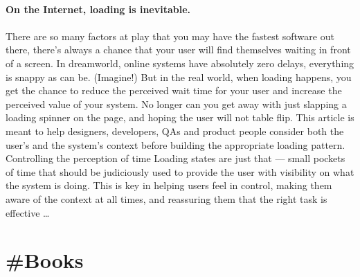 \documentclass[10pt,a4paper]{article}
\begin{document}
\begin{multicols}{2}
\paragraph{}
\textbf{On the Internet, loading is inevitable.}
\paragraph{}
 There are so many factors at play that you may have the fastest software out there, there’s always a chance that your user will find themselves waiting in front of a screen.
In dreamworld, online systems have absolutely zero delays, everything is snappy as can be. (Imagine!) But in the real world, when loading happens, you get the chance to reduce the perceived wait time for your user and increase the perceived value of your system.
No longer can you get away with just slapping a loading spinner on the page, and hoping the user will not table flip. This article is meant to help designers, developers, QAs and product people consider both the user’s and the system’s context before building the appropriate loading pattern.
Controlling the perception of time
Loading states are just that — small pockets of time that should be judiciously used to provide the user with visibility on what the system is doing. This is key in helping users feel in control, making them aware of the context at all times, and reassuring them that the right task is effective
\dots\par
\end{multicols}

\newpage
\section{\#Books}
\end{document}
